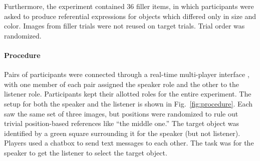 \documentclass[10pt,letterpaper]{article}
\newcommand{\figref}[1]{Fig.~\ref{#1}}
\begin{document}
Furthermore, the experiment contained 36 filler items, in which participants were asked to produce referential expressions for objects which differed only in size and color. Images from filler trials were not reused on target trials. Trial order was randomized. 

\paragraph{\bf Procedure}
Pairs of participants were connected through a real-time multi-player interface \cite{Hawkins15_RealTimeWebExperiments}, with one member of each pair assigned the speaker role and the other to the listener role. Participants kept their allotted roles for the entire experiment. 
The setup for both the speaker and the listener is shown in \figref{fig:procedure}. Each saw the same set of three images, but positions were randomized to rule out trivial position-based references like ``the middle one.'' The target object was identified by a green square surrounding it for the speaker (but not listener). Players used a chatbox to send text messages to each other. The task was for the speaker to get the listener to select the target object. %
\end{document}
